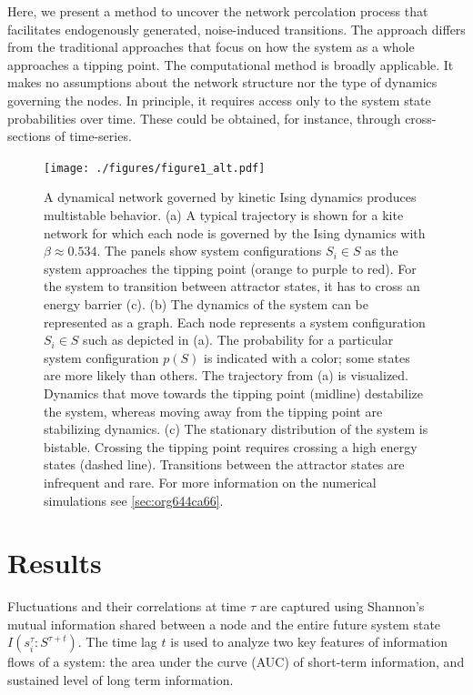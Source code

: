 \documentclass[a4paper, 11pt, twocolumn]{article}
\begin{document}
Here, we present a method to uncover the network percolation
process    that    facilitates    endogenously    generated,
noise-induced  transitions. The  approach  differs from  the
traditional approaches  that focus  on how  the system  as a
whole approaches  a tipping point. The  computational method
is  broadly applicable.  It makes  no assumptions  about the
network  structure nor  the type  of dynamics  governing the
nodes. In principle,  it requires access only  to the system
state probabilities over time.  These could be obtained, for
instance, through cross-sections of time-series.

\begin{figure}
\centering
\texttt{[image: ./figures/figure1\_alt.pdf]}
\caption{\label{fig:introduction}A dynamical network governed by kinetic Ising dynamics produces multistable behavior. (a) A typical trajectory is shown for a kite network for which each node is governed by the Ising dynamics with \(\beta \approx 0.534\). The panels show system configurations \(S_i \in S\) as the system approaches the tipping point (orange to purple to red). For the system to transition between attractor states, it has to cross an energy barrier (c). (b) The dynamics of the system can be represented as a graph. Each node represents a system configuration \(S_i \in S\) such as depicted in (a). The probability for a particular system configuration \(p(S)\) is indicated with a color; some states are more likely than others. The trajectory from (a) is visualized. Dynamics that move towards the tipping point (midline) destabilize the system, whereas moving away from the tipping point are stabilizing dynamics. (c) The stationary distribution of the system is bistable. Crossing the tipping point requires crossing a high energy states (dashed line). Transitions between the attractor states are infrequent and rare. For more information on the numerical simulations see \ref{sec:org644ca66}.}
\end{figure}

\section{Results}
\label{sec:org6f0b033}
Fluctuations and their correlations at time \(\tau\) are captured
using  Shannon's  mutual information  \cite{Cover2005}  shared
between  a   node  and   the  entire  future   system  state
\(I(s_i^{\tau}  : S^{\tau  +  t})\). The  time lag  \(t\)  is used  to
analyze two key  features of information flows  of a system:
the area  under the  curve (AUC) of  short-term information,
and sustained level of long term information.
\end{document}
